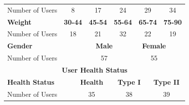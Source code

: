 \begin{table}[]
\begin{tabular}{clccclcccccl}
\multicolumn{2}{l}{Number of Users}      & \multicolumn{2}{c}{8}                & \multicolumn{2}{c}{17}               & \multicolumn{2}{c}{24}               & \multicolumn{2}{c}{29}               & \multicolumn{2}{c}{34}             \\
\multicolumn{2}{l}{\textbf{\cellcolor[gray]{0.8}Weight}}      & \multicolumn{2}{c}{\textbf{\cellcolor[gray]{0.8}30-44}}   & \multicolumn{2}{c}{\textbf{\cellcolor[gray]{0.8}45-54}}   & \multicolumn{2}{c}{\textbf{\cellcolor[gray]{0.8}55-64}}   & \multicolumn{2}{c}{\textbf{\cellcolor[gray]{0.8}65-74}}   & \multicolumn{2}{c}{\textbf{\cellcolor[gray]{0.8}75-90}} \\
\multicolumn{2}{l}{Number of Users}      & \multicolumn{2}{c}{18}               & \multicolumn{2}{c}{21}               & \multicolumn{2}{c}{32}               & \multicolumn{2}{c}{22}               & \multicolumn{2}{c}{19}             \\
\multicolumn{4}{l}{\textbf{\cellcolor[gray]{0.8}Gender}}      & \multicolumn{3}{c}{\textbf{\cellcolor[gray]{0.8}Male}}                                                               & \multicolumn{5}{c}{\textbf{\cellcolor[gray]{0.8}Female}}                                                          \\
\multicolumn{4}{l}{Number of Users}      & \multicolumn{3}{c}{57}                                                                          & \multicolumn{5}{c}{55}                                                                       \\ \hline\hline
\multicolumn{12}{c}{\textbf{User Health Status}}                                                                                                                                                                                          \\ \hline
\multicolumn{3}{l}{\textbf{\cellcolor[gray]{0.8}Health Status}}                   & \multicolumn{3}{c}{\textbf{\cellcolor[gray]{0.8}Health}}                     & \multicolumn{3}{c}{\textbf{\cellcolor[gray]{0.8}Type I}}                      & \multicolumn{3}{c}{\textbf{\cellcolor[gray]{0.8}Type II}}                  \\
\multicolumn{3}{l}{Number of Users}                          & \multicolumn{3}{c}{35}                                  & \multicolumn{3}{c}{38}                                   & \multicolumn{3}{c}{39}                                \\ \hline
\end{tabular}
\end{table}



